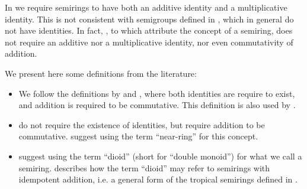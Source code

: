 \begin{remark}\label{rem:semiring_etymology}
  In  we require semirings to have both an additive identity and a multiplicative identity. This is not consistent with semigroups defined in , which in general do not have identities. In fact, , to which  attribute the concept of a semiring, does not require an additive nor a multiplicative identity, nor even commutativity of addition.

  We present here some definitions from the literature:
  \begin{itemize}
    \item We follow the definitions by  and , where both identities are require to exist, and addition is required to be commutative. This definition is also used by .

    \item {} do not require the existence of identities, but require addition to be commutative.  suggest using the term \enquote{near-ring} for this concept.

    \item {} suggest using the term \enquote{dioid} (short for \enquote{double monoid}) for what we call a semiring.  describes how the term \enquote{dioid} may refer to semirings with idempotent addition, i.e. a general form of the tropical semirings defined in .
  \end{itemize}
\end{remark}

